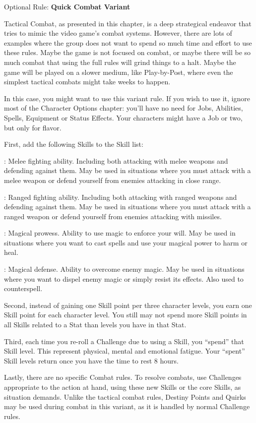 \begin{multiboco}
Optional Rule: \textbf{Quick Combat Variant}

Tactical Combat, as presented in this chapter, is a deep strategical endeavor that tries to mimic the video game's combat systems. However, there are lots of examples where the group does not want to spend so much time and effort to use these rules. Maybe the game is not focused on combat, or maybe there will be so much combat that using the full rules will grind things to a halt. Maybe the game will be played on a slower medium, like Play-by-Post, where even the simplest tactical combats might take weeks to happen.

In this case, you might want to use this variant rule. If you wish to use it, ignore most of the Character Options chapter: you'll have no need for Jobs, Abilities, Spells, Equipment or Status Effects. Your characters might have a Job or two, but only for flavor.

First, add the following Skills to the Skill list:

: Melee fighting ability. Including both attacking with melee weapons and defending against them. May be used in situations where you must attack with a melee weapon or defend yourself from enemies attacking in close range.

: Ranged fighting ability. Including both attacking with ranged weapons and defending against them. May be used in situations where you must attack with a ranged weapon or defend yourself from enemies attacking with missiles.

: Magical prowess. Ability to use magic to enforce your will. May be used in situations where you want to cast spells and use your magical power to harm or heal.

: Magical defense. Ability to overcome enemy magic. May be used in situations where you want to dispel enemy magic or simply resist its effects. Also used to counterspell.

Second, instead of gaining one Skill point per three character levels, you earn one Skill point for each character level. You still may not spend more Skill points in all Skills related to a Stat than levels you have in that Stat.

Third, each time you re-roll a Challenge due to using a Skill, you “spend” that Skill level. This represent physical, mental and emotional fatigue. Your “spent” Skill levels return once you have the time to rest 8 hours.

Lastly, there are no specific Combat rules. To resolve combats, use Challenges appropriate to the action at hand, using these new Skills or the core Skills, as situation demands. Unlike the tactical combat rules, Destiny Points and Quirks may be used during combat in this variant, as it is handled by normal Challenge rules.
\end{multiboco}

